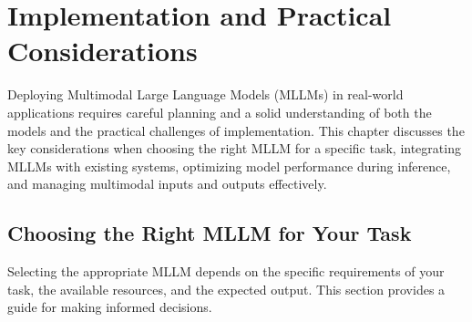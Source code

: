 \chapter{Implementation and Practical Considerations}

Deploying Multimodal Large Language Models (MLLMs) in real-world applications requires careful planning and a solid understanding of both the models and the practical challenges of implementation. This chapter discusses the key considerations when choosing the right MLLM for a specific task, integrating MLLMs with existing systems, optimizing model performance during inference, and managing multimodal inputs and outputs effectively.

\section{Choosing the Right MLLM for Your Task}

Selecting the appropriate MLLM depends on the specific requirements of your task, the available resources, and the expected output. This section provides a guide for making informed decisions.


